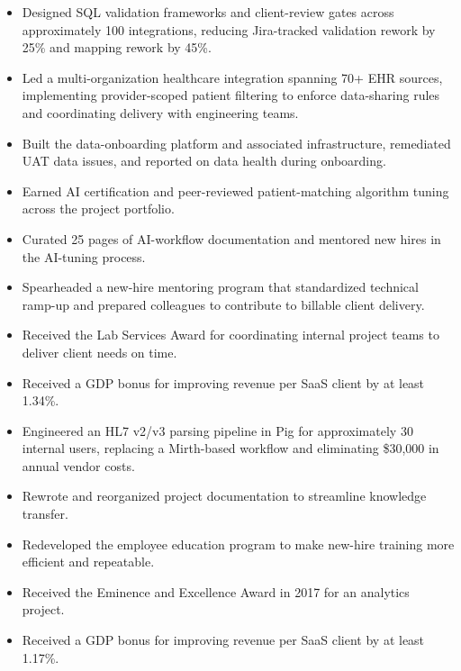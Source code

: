 \begin{itemize}
  \item Designed SQL validation frameworks and client-review gates across approximately 100 integrations, reducing Jira-tracked validation rework by 25\% and mapping rework by 45\%.
  \item Led a multi-organization healthcare integration spanning 70+ EHR sources, implementing provider-scoped patient filtering to enforce data-sharing rules and coordinating delivery with engineering teams.
  \item Built the data-onboarding platform and associated infrastructure, remediated UAT data issues, and reported on data health during onboarding.
  \item Earned AI certification and peer-reviewed patient-matching algorithm tuning across the project portfolio.
  \item Curated 25 pages of AI-workflow documentation and mentored new hires in the AI-tuning process.
  \item Spearheaded a new-hire mentoring program that standardized technical ramp-up and prepared colleagues to contribute to billable client delivery.
  \item Received the Lab Services Award for coordinating internal project teams to deliver client needs on time.
  \item Received a GDP bonus for improving revenue per SaaS client by at least 1.34\%.
\end{itemize}

\begin{itemize}
  \item Engineered an HL7 v2/v3 parsing pipeline in Pig for approximately 30 internal users, replacing a Mirth-based workflow and eliminating \$30,000 in annual vendor costs.
  \item Rewrote and reorganized project documentation to streamline knowledge transfer.
  \item Redeveloped the employee education program to make new-hire training more efficient and repeatable.
  \item Received the Eminence and Excellence Award in 2017 for an analytics project.
  \item Received a GDP bonus for improving revenue per SaaS client by at least 1.17\%.
\end{itemize}

